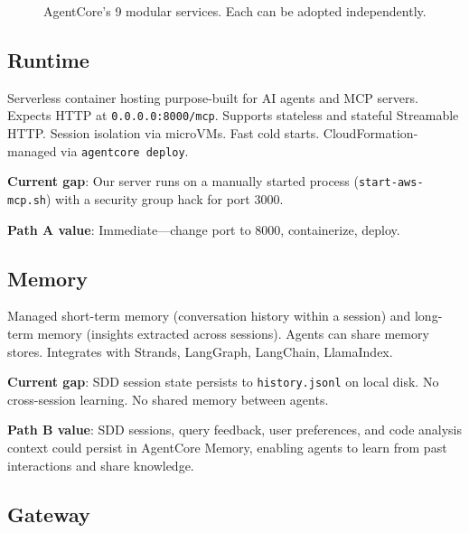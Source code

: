 \documentclass[11pt,letterpaper]{article}
\begin{document}
\begin{figure}[H]
\caption{AgentCore's 9 modular services. Each can be adopted independently.}
\label{fig:agentcore-services}
\end{figure}

\subsection{Runtime}

Serverless container hosting purpose-built for AI agents and MCP servers.
Expects HTTP at \texttt{0.0.0.0:8000/mcp}. Supports stateless and stateful
Streamable HTTP. Session isolation via microVMs. Fast cold starts.
CloudFormation-managed via \texttt{agentcore deploy}.

\textbf{Current gap}: Our server runs on a manually started process
(\texttt{start-aws-mcp.sh}) with a security group hack for port 3000.

\textbf{Path A value}: Immediate---change port to 8000, containerize, deploy.

\subsection{Memory}

Managed short-term memory (conversation history within a session) and
long-term memory (insights extracted across sessions). Agents can share
memory stores. Integrates with Strands, LangGraph, LangChain, LlamaIndex.

\textbf{Current gap}: SDD session state persists to \texttt{history.jsonl}
on local disk. No cross-session learning. No shared memory between agents.

\textbf{Path B value}: SDD sessions, query feedback, user preferences,
and code analysis context could persist in AgentCore Memory, enabling
agents to learn from past interactions and share knowledge.

\subsection{Gateway}
\end{document}

